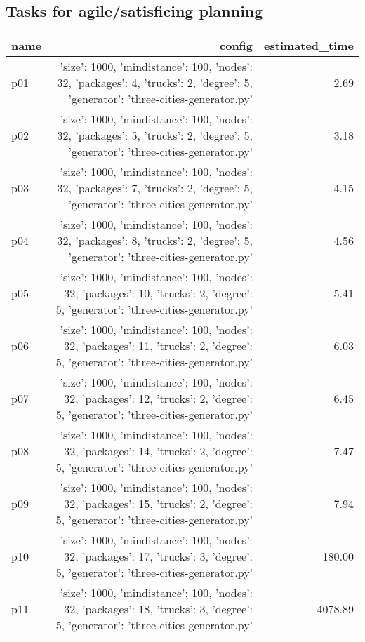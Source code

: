 \documentclass{article}
\begin{document}
                                \subsection*{Tasks for agile/satisficing planning}
                                
                            \begin{center}
                            \scriptsize
                            \begin{tabular}{@{}l|r|r@{}}
                            name & config & estimated\_time\\\midrule
                              p01&{'size': 1000, 'mindistance': 100, 'nodes': 32, 'packages': 4, 'trucks': 2, 'degree': 5, 'generator': 'three-cities-generator.py'}&2.69\\
  p02&{'size': 1000, 'mindistance': 100, 'nodes': 32, 'packages': 5, 'trucks': 2, 'degree': 5, 'generator': 'three-cities-generator.py'}&3.18\\
  p03&{'size': 1000, 'mindistance': 100, 'nodes': 32, 'packages': 7, 'trucks': 2, 'degree': 5, 'generator': 'three-cities-generator.py'}&4.15\\
  p04&{'size': 1000, 'mindistance': 100, 'nodes': 32, 'packages': 8, 'trucks': 2, 'degree': 5, 'generator': 'three-cities-generator.py'}&4.56\\
  p05&{'size': 1000, 'mindistance': 100, 'nodes': 32, 'packages': 10, 'trucks': 2, 'degree': 5, 'generator': 'three-cities-generator.py'}&5.41\\
  p06&{'size': 1000, 'mindistance': 100, 'nodes': 32, 'packages': 11, 'trucks': 2, 'degree': 5, 'generator': 'three-cities-generator.py'}&6.03\\
  p07&{'size': 1000, 'mindistance': 100, 'nodes': 32, 'packages': 12, 'trucks': 2, 'degree': 5, 'generator': 'three-cities-generator.py'}&6.45\\
  p08&{'size': 1000, 'mindistance': 100, 'nodes': 32, 'packages': 14, 'trucks': 2, 'degree': 5, 'generator': 'three-cities-generator.py'}&7.47\\
  p09&{'size': 1000, 'mindistance': 100, 'nodes': 32, 'packages': 15, 'trucks': 2, 'degree': 5, 'generator': 'three-cities-generator.py'}&7.94\\
  p10&{'size': 1000, 'mindistance': 100, 'nodes': 32, 'packages': 17, 'trucks': 3, 'degree': 5, 'generator': 'three-cities-generator.py'}&180.00\\
  p11&{'size': 1000, 'mindistance': 100, 'nodes': 32, 'packages': 18, 'trucks': 3, 'degree': 5, 'generator': 'three-cities-generator.py'}&4078.89\\

\end{tabular}
\end{center}
\end{document}

